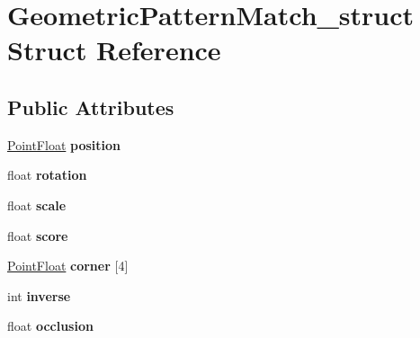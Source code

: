\hypertarget{structGeometricPatternMatch__struct}{\section{\-Geometric\-Pattern\-Match\-\_\-struct \-Struct \-Reference}
\label{structGeometricPatternMatch__struct}
}
\subsection*{\-Public \-Attributes}
\begin{DoxyCompactItemize}
\item 
\hypertarget{structGeometricPatternMatch__struct_ab5254448e23f118c6c0c663e88a98992}{\hyperlink{structPointFloat__struct}{\-Point\-Float} {\bfseries position}}\label{structGeometricPatternMatch__struct_ab5254448e23f118c6c0c663e88a98992}

\item 
\hypertarget{structGeometricPatternMatch__struct_a585051ffaa969f57ce86c1c1ae738bc8}{float {\bfseries rotation}}\label{structGeometricPatternMatch__struct_a585051ffaa969f57ce86c1c1ae738bc8}

\item 
\hypertarget{structGeometricPatternMatch__struct_a5385ddac4b58b9a715042e344908d9b9}{float {\bfseries scale}}\label{structGeometricPatternMatch__struct_a5385ddac4b58b9a715042e344908d9b9}

\item 
\hypertarget{structGeometricPatternMatch__struct_a2dfed99cc3f4dd14e344807cacddbc7c}{float {\bfseries score}}\label{structGeometricPatternMatch__struct_a2dfed99cc3f4dd14e344807cacddbc7c}

\item 
\hypertarget{structGeometricPatternMatch__struct_a50c0afd80a114d444d59273992493e8d}{\hyperlink{structPointFloat__struct}{\-Point\-Float} {\bfseries corner} \mbox{[}4\mbox{]}}\label{structGeometricPatternMatch__struct_a50c0afd80a114d444d59273992493e8d}

\item 
\hypertarget{structGeometricPatternMatch__struct_ac33376d8d193083ed257851a2a1bdd0d}{int {\bfseries inverse}}\label{structGeometricPatternMatch__struct_ac33376d8d193083ed257851a2a1bdd0d}

\item 
\hypertarget{structGeometricPatternMatch__struct_aff956b8b374f4c2cacb8617085c9bc90}{float {\bfseries occlusion}}\label{structGeometricPatternMatch__struct_aff956b8b374f4c2cacb8617085c9bc90}


\end{DoxyCompactItemize}
